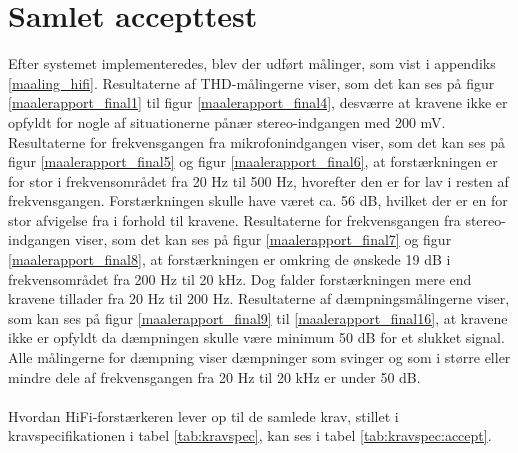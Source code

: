 \chapter{Samlet accepttest}
\label{acceptest}
Efter systemet implementeredes, blev der udført målinger, som vist i appendiks \ref{maaling_hifi}. Resultaterne af THD-målingerne viser, som det kan ses på figur \ref{maalerapport_final1} til figur \ref{maalerapport_final4}, desværre at kravene ikke er opfyldt for nogle af situationerne pånær stereo-indgangen med 200 mV. Resultaterne for frekvensgangen fra mikrofonindgangen viser, som det kan ses på figur \ref{maalerapport_final5} og figur \ref{maalerapport_final6}, at forstærkningen er for stor i frekvensområdet fra 20 Hz til 500 Hz, hvorefter den er for lav i resten af frekvensgangen. Forstærkningen skulle have været ca. 56 dB, hvilket der er en for stor afvigelse fra i forhold til kravene. Resultaterne for frekvensgangen fra stereo-indgangen viser, som det kan ses på figur \ref{maalerapport_final7} og figur \ref{maalerapport_final8}, at forstærkningen er omkring de ønskede 19 dB i frekvensområdet fra 200 Hz til 20 kHz. Dog falder forstærkningen mere end kravene tillader fra 20 Hz til 200 Hz. Resultaterne af dæmpningsmålingerne viser, som kan ses på figur \ref{maalerapport_final9} til \ref{maalerapport_final16}, at kravene ikke er opfyldt da dæmpningen skulle være minimum 50 dB for et slukket signal. Alle målingerne for dæmpning viser dæmpninger som svinger og som i større eller mindre dele af frekvensgangen fra 20 Hz til 20 kHz er under 50 dB.\\\\
Hvordan HiFi-forstærkeren lever op til de samlede krav, stillet i kravspecifikationen i tabel \ref{tab:kravspec}, kan ses i tabel \ref{tab:kravspec:accept}.

